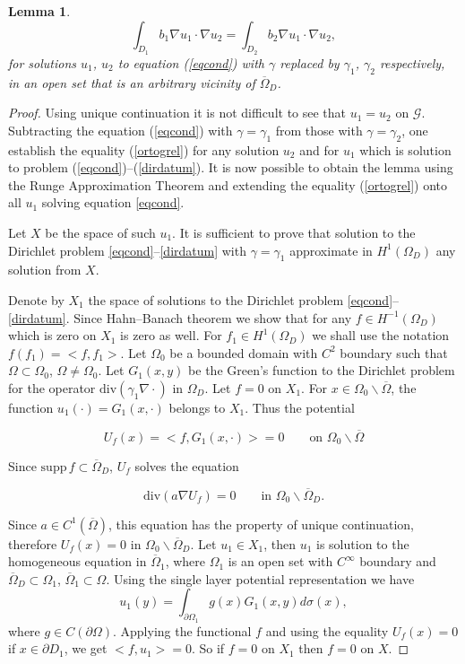 \documentclass[10pt, a4paper, twoside, openright]{book}
\theoremstyle{definition}
\theoremstyle{plain}
\theoremstyle{plain}
\theoremstyle{plain}
\theoremstyle{plain}
\theoremstyle{plain}
\newtheorem{lemma}[subsection]{Lemma}
\theoremstyle{plain}
\theoremstyle{plain}
\theoremstyle{plain}
\begin{document}
\begin{lemma}
\label{ortog}
\begin{equation}
\label{ortogrel}
\int_{D_1}b_1\nabla u_1\cdot\nabla u_2=\int_{D_2}b_2\nabla u_1\cdot\nabla u_2,
\end{equation}
for solutions $u_1$, $u_2$ to equation (\ref{eqcond})
with $\gamma$ replaced by $\gamma_1$, $\gamma_2$ respectively,
in an open set that is an arbitrary
vicinity of $\overline{\Omega}_D$.
\end{lemma}
\begin{proof}
Using unique continuation it is not difficult to see that
$u_{1}=u_2$ on $\mathcal{G}$.
Subtracting the equation (\ref{eqcond}) with $\gamma=\gamma_1$
from those with $\gamma=\gamma_2$, one establish the equality
(\ref{ortogrel}) for any solution $u_2$ and for $u_1$ which
is solution to problem (\ref{eqcond})--(\ref{dirdatum}).
It is now possible to obtain the lemma using the Runge Approximation
Theorem and extending the equality (\ref{ortogrel})
onto all $u_1$ solving equation \eqref{eqcond}.

Let $X$ be the space of such $u_1$. It is sufficient to prove that solution to
the Dirichlet problem \eqref{eqcond}--\eqref{dirdatum}
with $\gamma=\gamma_1$ approximate in $H^1(\Omega_D)$ any
solution from $X$.

Denote by $X_1$ the space of solutions to the Dirichlet problem
\eqref{eqcond}--\eqref{dirdatum}. Since
Hahn--Banach theorem we show that for any $f\in H^{-1}(\Omega_D)$ which
is zero on $X_1$ is zero as well.
For $f_1\in H^{1}(\Omega_D)$ we shall use the notation
$f(f_1)=<f,f_1>$.
Let $\Omega_0$ be a bounded domain with $C^2$ boundary
such that $\Omega\subset\Omega_0$, $\Omega\neq\Omega_0$.
Let $G_1(x,y)$ be the Green's function to the Dirichlet problem for the
operator $\mathrm{div}(\gamma_1\nabla\cdot)$ in $\Omega_D$.
Let $f=0$ on $X_1$.
For $x\in\Omega_0\smallsetminus\overline{\Omega}$,
the function
$u_1(\cdot)=G_1(x,\cdot)$ belongs to $X_1$.
Thus the potential

$$U_f(x)=<f,G_1(x,\cdot)>=0\qquad
\textrm{on }\Omega_0\smallsetminus\overline{\Omega}$$

Since $\mathrm{supp}\,f\subset\overline{\Omega}_D$, $U_f$ solves
the equation

$$\mathrm{div}(a\nabla U_f)=0\qquad
\textrm{in }\Omega_0\smallsetminus\overline{\Omega}_D.$$

Since $a\in C^1(\overline{\Omega})$, this equation has the property
of unique continuation, therefore $U_f(x)=0$ in $\Omega_0\smallsetminus\overline{\Omega}_D$.
Let $u_1\in X_1$, then $u_1$ is solution to the homogeneous
equation in $\overline{\Omega}_1$, where
$\Omega_1$ is an open set with $C^{\infty}$ boundary
and $\overline{\Omega}_D\subset\Omega_1$, $\overline{\Omega}_1\subset\Omega$.
Using the single layer potential representation we have
$$u_1(y)=\int_{\partial\Omega_1}g(x)G_1(x,y)d\sigma(x),$$
where $g\in C(\partial\Omega)$.
Applying the functional $f$ and using the equality $U_f(x)=0$
if $x\in\partial D_1$, we get $<f,u_1>=0$.
So if $f=0$ on $X_1$ then $f=0$ on $X$.
\end{proof}
\end{document}
